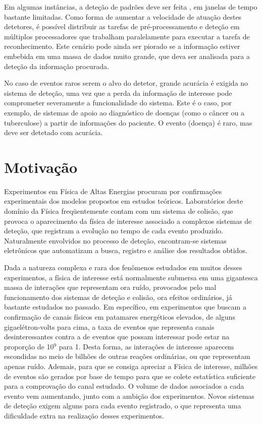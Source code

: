 Em algumas instâncias, a deteção de padrões deve ser feita , em
janelas de tempo bastante limitadas. Como forma de aumentar a velocidade de
atuação destes detetores, é possível distribuir as tarefas de
pré-processamento e deteção em múltiplos processadores que trabalham
paralelamente para executar a tarefa de reconhecimento. Este cenário pode
ainda ser piorado se a informação estiver embebida em uma massa de dados muito
grande, que deva ser analisada para a deteção da informação procurada.

No caso de eventos raros serem o alvo do detetor, grande acurácia é exigida no
sistema de deteção, uma vez que a perda da informação de interesse pode
comprometer severamente a funcionalidade do sistema. Este é o caso, por
exemplo, de sistemas de apoio ao diagnóstico de doenças (como o câncer ou a
tuberculose) a partir de informações do paciente. O evento (doença) é raro,
mas deve ser detetado com acurácia.

\section{Motivação}

Experimentos em Física de Altas Energias procuram por confirmações
experimentais dos modelos propostos em estudos teóricos. Laboratórios deste
domínio da Física freqüentemente contam com um sistema de colisão, que provoca
o aparecimento da física de interesse associado a complexos sistemas de
deteção, que registram a evolução no tempo de cada evento
produzido. Naturalmente envolvidos no processo de deteção, encontram-se
sistemas eletrônicos que automatizam a busca, registro e análise dos
resultados obtidos.

Dada a natureza complexa e rara dos fenômenos estudados em muitos desses
experimentos, a física de interesse está normalmente submersa em uma
gigantesca massa de interações que representam ora ruído, provocados pelo mal
funcionamento dos sistemas de deteção e colisão, ora efeitos ordinários, já
bastante estudados no passado. Em específico, em experimentos que buscam a
confirmação de canais físicos em patamares energéticos elevados, de alguns
gigaelétron-volts para cima, a taxa de eventos que representa canais
desinteressantes contra a de eventos que possam interessar pode estar na
proporção de 10$^9$ para 1. Desta forma, as interações de interesse aparecem
escondidas no meio de bilhões de outras reações ordinárias, ou que representam
apenas ruído. Ademais, para que se consiga apreciar a Física de interesse,
milhões de eventos são gerados por base de tempo para que se colete
estatística suficiente para a comprovação do canal estudado. O volume de dados
associados a cada evento vem aumentando, junto com a ambição dos
experimentos. Novos sistemas de deteção exigem alguns  para
cada evento registrado, o que representa uma dificuldade extra na realização
desses experimentos.

